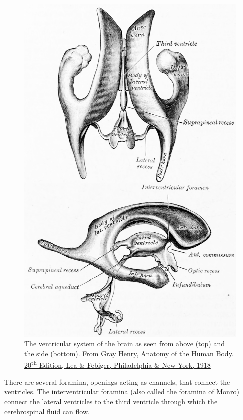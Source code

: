 \begin{figure}

{\centering \includegraphics[width=0.7\linewidth]{./figures/cns/GrayAnat1918p830} 

}

\caption{The ventricular system of the brain as seen from above (top) and the side (bottom). From \href{https://archive.org/details/anatomyofhumanbo1918gray/page/n6/mode/2up}{Gray Henry, Anatomy of the Human Body. 20\textsuperscript{th} Edition, Lea \& Febiger, Philadelphia \& New York, 1918}}\label{fig:ventricles}
\end{figure}

There are several foramina, openings acting as channels, that connect the ventricles. The interventricular foramina (also called the foramina of Monro) connect the lateral ventricles to the third ventricle through which the cerebrospinal fluid can flow.

